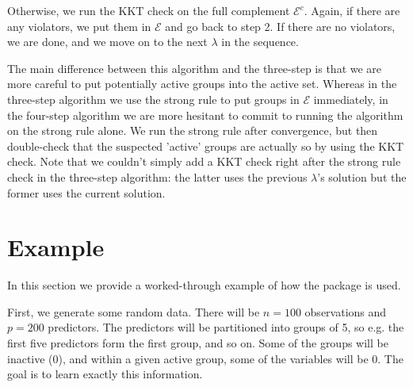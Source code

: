 \documentclass[12pt]{article}
\begin{document}
Otherwise, we run the KKT check on the full complement $\mathcal{E}^c$. Again, if there are any violators, we put them in $\mathcal{E}$ and go back to step 2. If there are no violators, we are done, and we move on to the next $\lambda$ in the sequence.

The main difference between this algorithm and the three-step is that we are more careful to put potentially active groups into the active set. Whereas in the three-step algorithm we use the strong rule to put groups in $\mathcal{E}$ immediately, in the four-step algorithm we are more hesitant to commit to running the algorithm on the strong rule alone. We run the strong rule after convergence, but then double-check that the suspected 'active' groups are actually so by using the KKT check. Note that we couldn't simply add a KKT check right after the strong rule check in the three-step algorithm: the latter uses the previous $\lambda$'s solution but the former uses the current solution.



\section{Example}

In this section we provide a worked-through example of how the package is used. 

First, we generate some random data. There will be $n=100$ observations and $p=200$ predictors. The predictors will be partitioned into groups of 5, so e.g. the first five predictors form the first group, and so on. Some of the groups will be inactive ($0$), and within a given active group, some of the variables will be $0$. The goal is to learn exactly this information.
\end{document}
